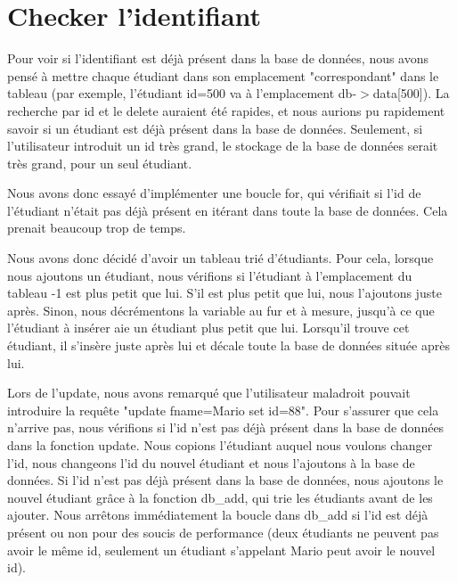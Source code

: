 \documentclass[utf8]{article}
\begin{document}
\section{Checker l'identifiant}
\indent{}
\par
Pour voir si l'identifiant est déjà présent dans la base de données, nous avons pensé à mettre chaque étudiant
dans son emplacement "correspondant" dans le tableau (par exemple, l'étudiant id=500 va à l'emplacement db-$>$data[500]). La recherche par id et le delete auraient été rapides, et nous 
aurions pu rapidement savoir si un étudiant est déjà présent dans la base de données.
Seulement, si l'utilisateur introduit un id très grand, le stockage de la base de données serait très grand, pour un seul étudiant.
\par
\indent{}
\par
Nous avons donc essayé d'implémenter une boucle for, qui vérifiait si l'id de l'étudiant n'était pas déjà présent en itérant dans toute la base de données.
Cela prenait beaucoup trop de temps. 
\par
\indent{}
\par
Nous avons donc décidé d'avoir un tableau trié d'étudiants. Pour cela, lorsque nous ajoutons un étudiant,
nous vérifions si l'étudiant à l'emplacement du tableau -1 est plus petit que lui. S'il est plus petit que lui, nous l'ajoutons juste après. Sinon, 
nous décrémentons la variable au fur et à mesure, jusqu'à ce que l'étudiant à insérer aie un étudiant plus petit que lui. Lorsqu'il trouve cet étudiant, il s'insère juste après lui
et décale toute la base de données située après lui.
\par
\indent{}
\par
Lors de l'update, nous avons remarqué que l'utilisateur maladroit pouvait introduire la requête "update fname=Mario set id=88".
Pour s'assurer que cela n'arrive pas, nous vérifions si l'id n'est pas déjà présent dans la base de données dans la fonction update.
Nous copions l'étudiant auquel nous voulons changer l'id, nous changeons l'id du nouvel étudiant et nous l'ajoutons à la base de données. Si l'id 
n'est pas déjà présent dans la base de données, nous ajoutons le nouvel étudiant grâce à la fonction db\_add, qui trie les étudiants avant de les ajouter.
Nous arrêtons immédiatement la boucle dans db\_add si l'id est déjà présent ou non pour des soucis de performance (deux étudiants ne peuvent pas avoir le même id, 
seulement un étudiant s'appelant Mario peut avoir le nouvel id). 
\par
\end{document}
